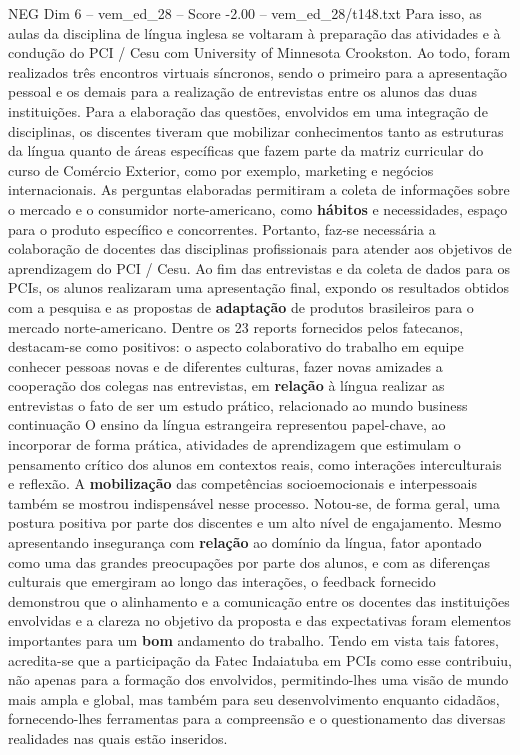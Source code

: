 \begin{textsample}{NEG Dim 6 – vem\_ed\_28 – Score -2.00 – vem\_ed\_28/t148.txt}
Para isso, as aulas da disciplina de língua inglesa se voltaram à preparação das atividades e à condução do PCI / Cesu com University of Minnesota Crookston.
Ao todo, foram realizados três encontros virtuais síncronos, sendo o primeiro para a apresentação pessoal e os demais para a realização de entrevistas entre os alunos das duas instituições.
Para a elaboração das questões, envolvidos em uma integração de disciplinas, os discentes tiveram que mobilizar conhecimentos tanto as estruturas da língua quanto de áreas específicas que fazem parte da matriz curricular do curso de Comércio Exterior, como por exemplo, marketing e negócios internacionais.
As perguntas elaboradas permitiram a coleta de informações sobre o mercado e o consumidor norte-americano, como \textbf{hábitos} e necessidades, espaço para o produto específico e concorrentes.
Portanto, faz-se necessária a colaboração de docentes das disciplinas profissionais para atender aos objetivos de aprendizagem do PCI / Cesu.
Ao fim das entrevistas e da coleta de dados para os PCIs, os alunos realizaram uma apresentação final, expondo os resultados obtidos com a pesquisa e as propostas de \textbf{adaptação} de produtos brasileiros para o mercado norte-americano.
Dentre os 23 reports fornecidos pelos fatecanos, destacam-se como positivos: o aspecto colaborativo do trabalho em equipe conhecer pessoas novas e de diferentes culturas, fazer novas amizades a cooperação dos colegas nas entrevistas, em \textbf{relação} à língua realizar as entrevistas o fato de ser um estudo prático, relacionado ao mundo business continuação O ensino da língua estrangeira representou papel-chave, ao incorporar de forma prática, atividades de aprendizagem que estimulam o pensamento crítico dos alunos em contextos reais, como interações interculturais e reflexão.
A \textbf{mobilização} das competências socioemocionais e interpessoais também se mostrou indispensável nesse processo.
Notou-se, de forma geral, uma postura positiva por parte dos discentes e um alto nível de engajamento.
Mesmo apresentando insegurança com \textbf{relação} ao domínio da língua, fator apontado como uma das grandes preocupações por parte dos alunos, e com as diferenças culturais que emergiram ao longo das interações, o feedback fornecido demonstrou que o alinhamento e a comunicação entre os docentes das instituições envolvidas e a clareza no objetivo da proposta e das expectativas foram elementos importantes para um \textbf{bom} andamento do trabalho.
Tendo em vista tais fatores, acredita-se que a participação da Fatec Indaiatuba em PCIs como esse contribuiu, não apenas para a formação dos envolvidos, permitindo-lhes uma visão de mundo mais ampla e global, mas também para seu desenvolvimento enquanto cidadãos, fornecendo-lhes ferramentas para a compreensão e o questionamento das diversas realidades nas quais estão inseridos.

\end{textsample}
